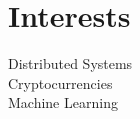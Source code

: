 \documentclass[letterpaper]{deedy-resume} %
\begin{document}
\begin{minipage}[t]{0.33\textwidth}
\sectionspace %


\section{Interests}
Distributed Systems \\
Cryptocurrencies \\
Machine Learning

\sectionspace %


\end{minipage} %
\hfill
%
%
\end{document}

